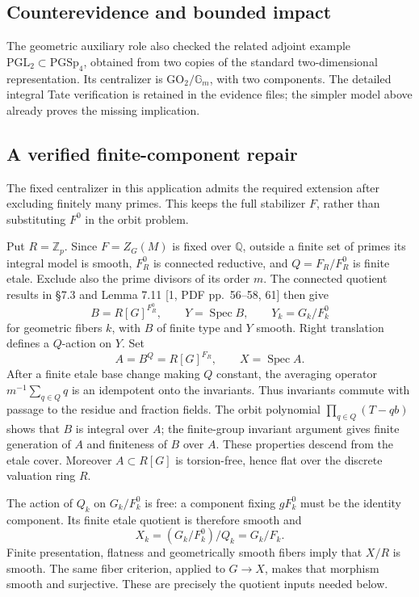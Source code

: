 \documentclass[10pt]{article}
\begin{document}
\subsection*{Counterevidence and bounded impact}
The geometric auxiliary role also checked the related adjoint example \(\mathrm{PGL}_2\subset\mathrm{PGSp}_4\), obtained from two copies of the standard two-dimensional representation. Its centralizer is \(\mathrm{GO}_2/\mathbb G_m\), with two components. The detailed integral Tate verification is retained in the evidence files; the simpler model above already proves the missing implication.\par
\subsection*{A verified finite-component repair}
The fixed centralizer in this application admits the required extension after excluding finitely many primes. This keeps the full stabilizer \(F\), rather than substituting \(F^0\) in the orbit problem.\par
Put \(R=\mathbb Z_p\). Since \(F=Z_G(M)\) is fixed over \(\mathbb Q\), outside a finite set of primes its integral model is smooth, \(F^0_R\) is connected reductive, and \(Q=F_R/F^0_R\) is finite etale. Exclude also the prime divisors of its order \(m\). The connected quotient results in §7.3 and Lemma 7.11 [1, PDF pp. 56–58, 61] then give \[B=R[G]^{F^0_R},\qquad Y=\operatorname{Spec}B,
 \qquad Y_k=G_k/F^0_k\] for geometric fibers \(k\), with \(B\) of finite type and \(Y\) smooth. Right translation defines a \(Q\)-action on \(Y\). Set \[A=B^Q=R[G]^{F_R},\qquad X=\operatorname{Spec}A.\] After a finite etale base change making \(Q\) constant, the averaging operator \(m^{-1}\sum_{q\in Q}q\) is an idempotent onto the invariants. Thus invariants commute with passage to the residue and fraction fields. The orbit polynomial \(\prod_{q\in Q}(T-qb)\) shows that \(B\) is integral over \(A\); the finite-group invariant argument gives finite generation of \(A\) and finiteness of \(B\) over \(A\). These properties descend from the etale cover. Moreover \(A\subset R[G]\) is torsion-free, hence flat over the discrete valuation ring \(R\).\par
The action of \(Q_k\) on \(G_k/F^0_k\) is free: a component fixing \(gF^0_k\) must be the identity component. Its finite etale quotient is therefore smooth and \[X_k=(G_k/F^0_k)/Q_k=G_k/F_k .\] Finite presentation, flatness and geometrically smooth fibers imply that \(X/R\) is smooth. The same fiber criterion, applied to \(G\to X\), makes that morphism smooth and surjective. These are precisely the quotient inputs needed below.\par
\end{document}
